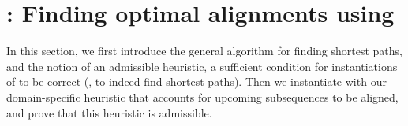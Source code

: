 \section{\astarix: Finding optimal alignments using \A} \label{TRIEsec:astarix-algo}

In this section, we first introduce the general \A algorithm for finding
shortest paths, and the notion of an admissible heuristic, a sufficient
condition for instantiations of \A to be correct (\ie, to indeed find shortest
paths). Then we instantiate \A with our domain-specific heuristic that accounts
for upcoming subsequences to be aligned, and prove that this heuristic is
admissible.



